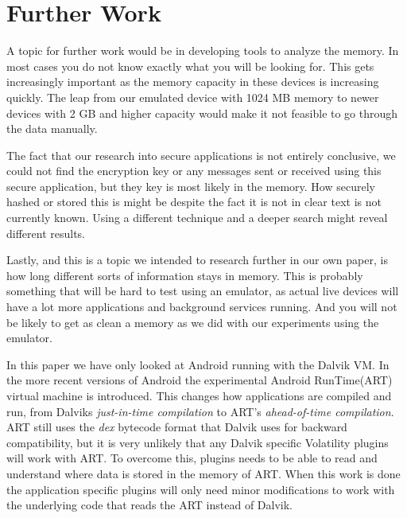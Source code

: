 \section{Further Work}
A topic for further work would be in developing tools
to analyze the memory. In most cases you do not know exactly what you will be looking for.
This gets increasingly important as the memory capacity
in these devices is increasing quickly. The leap from our
emulated device with 1024 MB memory to newer devices with
2 GB and higher capacity would make it not feasible to go
through the data manually.

The fact that our research into secure applications is not
entirely conclusive, we could not find the encryption key or any
messages sent or received using this secure application, but
they key is most likely in the memory. How securely hashed
or stored this is might be despite the fact it is not in clear text
is not currently known. Using a different technique and a deeper
search might reveal different results.

Lastly, and this is a topic we intended to research further
in our own paper, is how long different sorts of information
stays in memory. This is probably something that will be hard
to test using an emulator, as actual live devices will have a lot
more applications and background services running. And you will not be
likely to get as clean a memory as we did with our experiments
using the emulator.

In this paper we have only looked at Android running with
the Dalvik VM. In the more recent versions of
Android the experimental Android RunTime(ART) virtual
machine is introduced. This changes how applications are compiled
and run, from Dalviks \textit{just-in-time compilation} to
ART’s \textit{ahead-of-time compilation}. ART still uses the
\textit{dex} bytecode format that Dalvik uses for backward
compatibility, but it is very unlikely that any Dalvik specific
Volatility plugins will work with ART. To overcome this, plugins
needs to be able to read and understand where data is stored in the memory of
ART. When this work is done the application specific plugins will only need
minor modifications to work with the underlying code that reads the ART instead
of Dalvik.

